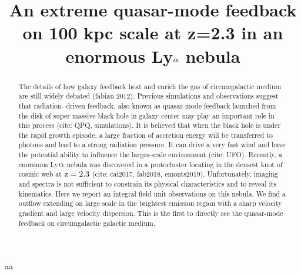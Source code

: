 \documentclass{nature}
\title{An extreme quasar-mode feedback on 100 kpc scale at z=2.3 in an enormous Ly$\rm \alpha$ nebula}
\author{}
\begin{document}
\maketitle

\begin{affiliations}
aa
\end{affiliations}

\begin{abstract}
The details of how galaxy feedback heat and enrich the gas of 
circumgalactic medium are still widely debated (fabian 2012).
Previous simulations and observations suggest that radiation-
driven feedback, also known as quasar-mode feedback launched 
from the disk of super massive black hole in galaxy center 
may play an important role in this process (cite: QPQ, simulations). 
It is believed that when the black hole is under the rapid growth 
episode, a large fraction of accretion energy will be transferred 
to photons and lead to a strong radiation pressure. It can 
drive a very fast wind and have the potential ability to influence 
the larges-scale environment (cite: UFO). Recently, a enormous 
Ly$\rm \alpha$ nebula was discovered in a protocluster locating 
in the densest knot of cosmic web at $\rm z=2.3$ (cite: cai2017, 
fab2018, emonts2019). Unfortunately, imaging and spectra is 
not sufficient to constrain its physical characteristics 
and to reveal its kinematics. Here we report an integral field 
unit observations on this nebula. We find a outflow extending on
large scale in the brightest emission region with a sharp velocity 
gradient and large velocity dispersion. This is the first to directly
see the quasar-mode feedback on circumgalactic galactic medium.

\end{abstract}
\end{document}
